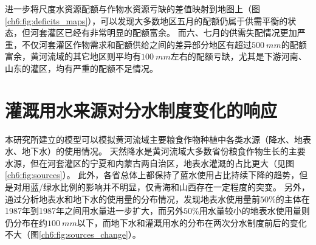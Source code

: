 进一步将尺度水资源配额与作物水资源亏缺的差值映射到地图上（图\ref{ch6:fig:deficits_maps}），可以发现大多数地区五月的配额仍属于供需平衡的状态，但河套灌区已经有非常明显的配额富余。
而六、七月的供需失配情况更加严重，不仅河套灌区作物需求和配额供给之间的差异部分地区有超过$500~mm$的配额富余，黄河流域的其它地区则平均有$100~mm$左右的配额亏缺，尤其是下游河南、山东的灌区，均有严重的配额不足情况。





\section{灌溉用水来源对分水制度变化的响应}

本研究所建立的模型可以模拟黄河流域主要粮食作物种植中各类水源（降水、地表水、地下水）的使用情况。
天然降水是黄河流域大多数省份粮食作物生长的主要水源，但在河套灌区的宁夏和内蒙古两自治区，地表水灌溉的占比更大（见图\ref{ch6:fig:sources}）。
此外，各省总体上都保持了蓝水使用占比持续下降的趋势，但是对用蓝/绿水比例的影响并不明显，仅青海和山西存在一定程度的突变。
另外，通过分析地表水和地下水的使用量的分布情况，发现地表水使用量前$50\%$的主体在1987年到1987年之间用水量进一步扩大，而另外$50\%$用水量较小的地表水使用量则仍分布在约$100~mm$以下，而地下水和灌溉用水的分布在两次分水制度前后的变化不大（图\ref{ch6:fig:sources_change}）。


